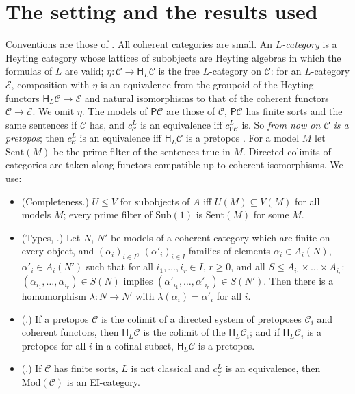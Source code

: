 \documentclass[11pt]{amsart}
\theoremstyle{definition}
\newcommand{\Sub}{\mathrm{Sub}}
\newcommand{\Mod}{\mathrm{Mod}}
\newcommand{\Sent}{\mathrm{Sent}}
\newcommand{\PP}{\mathsf P}
\newcommand{\HH}{\mathsf H}
\newcommand{\cC}{\mathcal C}
\newcommand{\cE}{\mathcal E}
\begin{document}
\section{The setting and the results used}\label{sec:setting}

Conventions are those of \cite{Finsorts}. All coherent categories are
small. An \emph{$L$-category} is a Heyting category whose lattices of
subobjects are Heyting algebras in which the formulas of $L$ are
valid; $\eta\colon\cC\to\HH_L\cC$ is the free $L$-category on $\cC$:
for an $L$-category $\cE$, composition with $\eta$ is an equivalence
from the groupoid of the Heyting functors $\HH_L\cC\to\cE$ and natural
isomorphisms to that of the coherent functors $\cC\to\cE$. We omit
$\eta$. The models of $\PP\cC$ are those of $\cC$, $\PP\cC$ has finite
sorts and the same sentences if $\cC$ has, and $c^L_\cC$ is an
equivalence iff $c^L_{\PP\cC}$ is. So \emph{from now on $\cC$ is a
pretopos}; then $c^L_\cC$ is an equivalence iff $\HH_L\cC$ is a
pretopos \cite[Lemma~2.2]{Interm}. For a model $M$ let $\Sent(M)$ be
the prime filter of the sentences true in $M$. Directed colimits of
categories are taken along functors compatible up to coherent
isomorphisms. We use:

\begin{itemize}
\item[(R1)] (Completeness.) $U\le V$ for subobjects of $A$ iff
$U(M)\subseteq V(M)$ for all models $M$; every prime filter of
$\Sub(1)$ is $\Sent(M)$ for some $M$.
\item[(R2)] (Types, \cite[Lemma~4.3]{Finsorts}.) Let $N$, $N'$ be
models of a coherent category which are finite on every object, and
$(\alpha_i)_{i\in I}$, $(\alpha'_i)_{i\in I}$ families of elements
$\alpha_i\in A_i(N)$, $\alpha'_i\in A_i(N')$ such that for all
$i_1,\dots,i_r\in I$, $r\ge0$, and all $S\le A_{i_1}\times\dots\times
A_{i_r}$: $(\alpha_{i_1},\dots,\alpha_{i_r})\in S(N)$ implies
$(\alpha'_{i_1},\dots,\alpha'_{i_r})\in S(N')$. Then there is a
homomorphism $\lambda\colon N\to N'$ with $\lambda(\alpha_i)=
\alpha'_i$ for all $i$.
\item[(R3)] (\cite[Lemma~5.3 and its proof]{Finsorts}.) If a pretopos
$\cC$ is the colimit of a directed system of pretoposes $\cC_i$ and
coherent functors, then $\HH_L\cC$ is the colimit of the $\HH_L\cC_i$;
and if $\HH_L\cC_i$ is a pretopos for all $i$ in a cofinal subset,
$\HH_L\cC$ is a pretopos.
\item[(R4)] (\cite[Remark after Thm.~5.5]{Finsorts}.) If $\cC$ has
finite sorts, $L$ is not classical and $c^L_\cC$ is an equivalence,
then $\Mod(\cC)$ is an EI-category.
\end{itemize}
\end{document}
